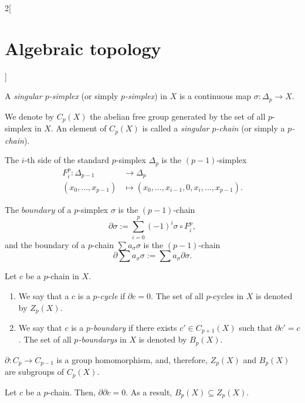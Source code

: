 \documentclass[../../../main_math.tex]{subfiles}
\begin{document}
\begin{multicols}{2}[\section{Algebraic topology}]
	\begin{definition}
		A \emph{singular $p$-simplex} (or simply \emph{$p$-simplex}) in $X$ is a continuous map $\sigma: \Delta_p \to X$.
	\end{definition}
	
	\begin{definition}
		We denote by $C_p(X)$ the abelian free group generated by the set of all $p$-simplex in $X$. An element of $C_p(X)$ is called a \emph{singular $p$-chain} (or simply a \emph{$p$-chain}). 
	\end{definition}

	\begin{definition}
		The $i$-th side of the standard $p$-simplex $\Delta_p$ is the $(p-1)$-simplex
		\begin{align*}
			F_i^p : \Delta_{p-1} &\longrightarrow \Delta_p \\
					(x_0, ..., x_{p-1}) & \longmapsto (x_0,...,x_{i-1}, 0, x_{i}, ..., x_{p-1}).
		\end{align*}
	\end{definition}

	\begin{definition}
		The $boundary$ of a $p$-simplex $\sigma$ is the $(p-1)$-chain $$\partial\sigma:= \sum_{i=0}^{p} (-1)^i \sigma \circ F_i^p,$$ and the boundary of a $p$-chain $\sum a_{\sigma} \sigma$ is the $(p-1)$-chain $$\partial \sum a_{\sigma} \sigma := \sum a_{\sigma} \partial\sigma.$$ 
	\end{definition}

	\begin{definition} 
		Let $c$ be a $p$-chain in $X$.
		\begin{enumerate}
			\item We say that a $c$ is a \emph{$p$-cycle} if $\partial c=0$. The set of all $p$-cycles in $X$ is denoted by $Z_p(X)$.
			\item We say that $c$ is a \emph{$p$-boundary} if there exists $c'\in C_{p+1}(X)$ such that $\partial c'=c$. The set of all \emph{$p$-boundarys} in $X$ is denoted by $B_p(X)$.
		\end{enumerate}
	\end{definition}

	\begin{proposition}
		$\partial : C_p \to C_{p-1}$ is a group homomorphism, and, therefore, $Z_p(X)$ and $B_p(X)$ are subgroups of $C_p(X)$.
	\end{proposition}
	
	\begin{lemma}
		Let $c$ be a $p$-chain. Then, $\partial \partial c=0$. As a result, $B_p(X)\subseteq Z_p(X)$.
	\end{lemma}


\end{multicols}
\end{document}
